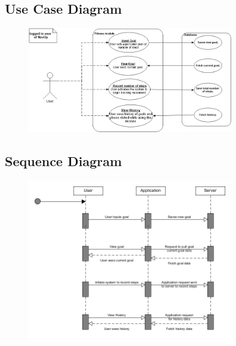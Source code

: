 \subsection{Use Case Diagram}
\begin{figure}[!htbp]
  \includegraphics[width=0.8\textwidth]{Fitness/FitnessUseCase.png}
\end{figure}


\subsection{Sequence Diagram}
\begin{figure}[!htbp]
  \includegraphics[width=0.8\textwidth]{Fitness/FitnessSequenceDgm.png}
\end{figure}



